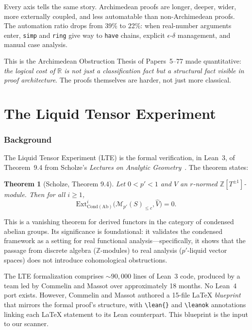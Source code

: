 \documentclass[11pt,a4paper]{article}
\theoremstyle{plain}
\newtheorem{theorem}{Theorem}[section]
\theoremstyle{definition}
\newcommand{\R}{\mathbb{R}}
\newcommand{\Z}{\mathbb{Z}}
\begin{document}
Every axis tells the same story.  Archimedean proofs are longer, deeper,
wider, more externally coupled, and less automatable than non-Archimedean
proofs.  The automation ratio drops from 39\% to 22\%: when real-number
arguments enter, \texttt{simp} and \texttt{ring} give way to \texttt{have}
chains, explicit $\epsilon$-$\delta$ management, and manual case
analysis.

This is the Archimedean Obstruction Thesis of Papers~5--77 made
quantitative: \emph{the logical cost of $\R$ is not just a classification
fact but a structural fact visible in proof architecture}.  The proofs
themselves are harder, not just more classical.


\part{The Liquid Tensor Experiment}\label{part:lte}

\section{Background}\label{sec:lte-background}

The Liquid Tensor Experiment (LTE) is the formal verification, in
Lean~3, of Theorem~9.4 from Scholze's \emph{Lectures on Analytic
Geometry}~\cite{Scholze2020}.  The theorem states:

\begin{theorem}[Scholze, Theorem 9.4]
Let $0 < p' < 1$ and $V$ an $r$-normed $\Z[T^{\pm 1}]$-module.
Then for all $i \geq 1$,
\[
  \mathrm{Ext}^i_{\mathrm{Cond}(\mathrm{Ab})}
  \bigl(\mathcal{M}_{p'}(S)_{\leq c}, \widehat{V}\bigr) = 0.
\]
\end{theorem}

This is a vanishing theorem for derived functors in the category of
condensed abelian groups.  Its significance is foundational: it
validates the condensed framework as a setting for real functional
analysis---specifically, it shows that the passage from discrete
algebra ($\Z$-modules) to real analysis ($p'$-liquid vector spaces)
does not introduce cohomological obstructions.

The LTE formalization comprises ${\sim}90{,}000$ lines of Lean~3
code, produced by a team led by Commelin and Massot over approximately
18 months.  No Lean~4 port exists.  However, Commelin and Massot
authored a 15-file LaTeX \emph{blueprint} that mirrors the formal
proof's structure, with \texttt{\textbackslash lean\{\}} and
\texttt{\textbackslash leanok} annotations linking each LaTeX
statement to its Lean counterpart.  This blueprint is the input to
our scanner.
\end{document}
